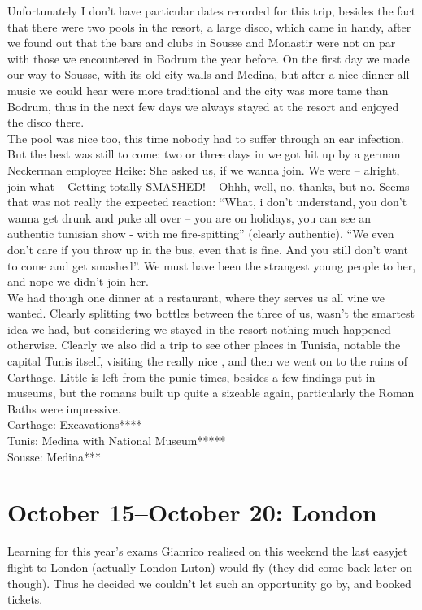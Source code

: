Unfortunately I don't have particular dates recorded for this trip, besides the fact that there were two pools in the resort, a large disco, which came in handy, after we found out that the bars and clubs in Sousse and Monastir were not on par with those we encountered in Bodrum the year before. On the first day we made our way to Sousse, with its old city walls and Medina, but after a nice dinner all music we could hear were more traditional and the city was more tame than Bodrum, thus in the next few days we always stayed at the resort and enjoyed the disco there.\\
The pool was nice too, this time nobody had to suffer through an ear infection. But the best was still to come: two or three days in we got hit up by a german Neckerman employee Heike: She asked us, if we wanna join. We were -- alright, join what -- Getting totally SMASHED! -- Ohhh, well, no, thanks, but no. Seems that was not really the expected reaction: ``What, i don't understand, you don't wanna get drunk and puke all over -- you are on holidays, you can see an authentic tunisian show - with me fire-spitting'' (clearly authentic). ``We even don't care if you throw up in the bus, even that is fine. And you still don't want to come and get smashed''. We must have been the strangest young people to her, and nope we didn't join her.\\
We had though one dinner at a restaurant, where they serves us all vine we wanted. Clearly splitting two bottles between the three of us, wasn't the smartest idea we had, but considering we stayed in the resort nothing much happened otherwise. Clearly we also did a trip to see other places in Tunisia, notable the capital Tunis itself, visiting the really nice , and then we went on to the ruins of Carthage. Little is left from the punic times, besides a few findings put in museums, but the romans built up quite a sizeable again, particularly the Roman Baths were impressive.\\

Carthage: Excavations****\\
 Tunis: Medina with National Museum*****\\
 Sousse: Medina***

\section{October 15--October 20: London}
\label{2004:London}

Learning for this year's exams Gianrico realised on this weekend the last easyjet flight to London (actually London Luton) would fly (they did come back later on though). Thus he decided we couldn't let such an opportunity go by, and booked tickets.\\

